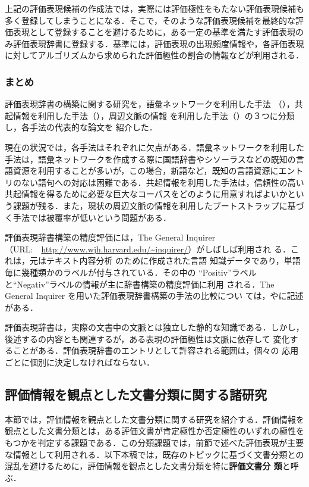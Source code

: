 上記の評価表現候補の作成法では，実際には評価極性をもたない評価表現候補も
多く登録してしまうことになる．そこで，そのような評価表現候補を最終的な評
価表現として登録することを避けるために，ある一定の基準を満たす評価表現の
み評価表現辞書に登録する．基準には，評価表現の出現頻度情報や，各評価表現
に対してアルゴリズムから求められた評価極性の割合の情報などが利用される．

\subsubsection{まとめ}

評価表現辞書の構築に関する研究を，語彙ネットワークを利用した手法
（），共起情報を利用した手法（），周辺文脈の情報
を利用した手法（）の３つに分類し，各手法の代表的な論文を
紹介した．

現在の状況では，各手法はそれぞれに欠点がある．語彙ネットワークを利用した
手法は，語彙ネットワークを作成する際に国語辞書やシソーラスなどの既知の言
語資源を利用することが多いが，この場合，新語など，既知の言語資源にエント
リのない語句への対応は困難である．共起情報を利用した手法は，信頼性の高い
共起情報を得るために必要な巨大なコーパスをどのように用意すればよいかとい
う課題が残る．また，現状の周辺文脈の情報を利用したブートストラップに基づ
く手法では被覆率が低いという問題がある．

評価表現辞書構築の精度評価には，The General Inquirer \cite{stone1966a} 
（URL:~~\url{http://www.wjh.harvard.edu/~inquirer/}）がしばしば利用され
る．これは，元はテキスト内容分析\cite{stone1966a} のために作成された言語
知識データであり，単語毎に幾種類かのラベルが付与されている．その中の
``Positiv''ラベルと``Negativ''ラベルの情報が主に辞書構築の精度評価に利用
される．The General Inquirer を用いた評価表現辞書構築の手法の比較につい
ては，\cite{takamura2005a}や\cite{takamura2005c}に記述がある．

評価表現辞書は，実際の文書中の文脈とは独立した静的な知識である．しかし，
後述するの内容とも関連するが，ある表現の評価極性は文脈に依存して
変化することがある．評価表現辞書のエントリとして許容される範囲は，個々の
応用ごとに個別に決定しなければならない．

\subsection{評価情報を観点とした文書分類に関する諸研究}
\label{sec:dc}

本節では，評価情報を観点とした文書分類に関する研究を紹介する．評価情報を
観点とした文書分類とは，ある評価文書が肯定極性か否定極性のいずれの極性を
もつかを判定する課題である．この分類課題では，前節で述べた評価表現が主要
な情報として利用される．以下本稿では，既存のトピックに基づく文書分類との
混乱を避けるために，評価情報を観点とした文書分類を特に\textbf{評価文書分
類}と呼ぶ．

